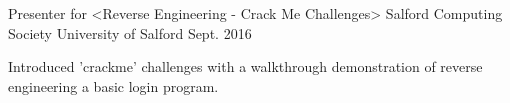 

\begin{cventries}

  \cventry
    {Presenter for <Reverse Engineering - Crack Me Challenges>} %
    {Salford Computing Society} %
    {University of Salford} %
    {Sept. 2016} %
    {
      \begin{cvitems} %
        \item {Introduced 'crackme' challenges with a walkthrough demonstration of reverse engineering a basic login program.}
      \end{cvitems}
    }

\end{cventries}
